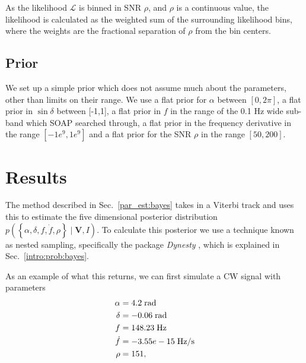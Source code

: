 \if
As the likelihood $\mathcal{L}$ is binned in \gls{SNR} $\rho$, and $\rho$ is a continuous value, the likelihood is calculated as the weighted sum of the surrounding likelihood bins, where the weights are the fractional separation of $\rho$ from the bin centers. 
\fi

%
\subsection{Prior}
%
We set up a simple prior which does not assume much about the parameters, other than limits on their range. 
We use a flat prior for $\alpha$ between $[0,2\pi]$, a flat prior in $\sin{\delta}$ between [-1,1], a flat prior in $f$ in the range of the 0.1 Hz wide sub-band which SOAP searched through, a flat prior in the frequency derivative in the range $[-1e^{9},1e^{9}]$ and a flat prior for the \gls{SNR} $\rho$ in the range $[50,200]$.


\clearpage

\section{\label{par_est:results}Results}

The method described in Sec.~\ref{par_est:bayes} takes in a Viterbi track and uses this to estimate the five dimensional posterior distribution $p\left(\left\{ \alpha, \delta, f, \dot{f}, \rho \right\} \mid \bm{V}, I \right)$.
To calculate this posterior we use a technique known as nested sampling, specifically the package {\it Dynesty} \citep{speagle2019DynestyDynamic}, which is explained in Sec.~\ref{intro:prob:bayes}. 

As an example of what this returns, we can first simulate a \gls{CW} signal with parameters 
\begin{equation}
    \label{par_est:results:examplepars}
    \begin{split}
        \alpha &= 4.2 \; \rm{rad}\\
        \delta &= -0.06 \; \rm{rad} \\
        f &= 148.23 \; \rm{Hz}\\
        \dot{f} &= -3.55e-15 \; \rm{Hz/s}\\
        \rho &= 151,\\
    \end{split}
\end{equation}

